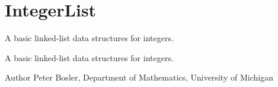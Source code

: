 \hypertarget{group__IntegerList}{\section{Integer\+List}
\label{group__IntegerList}
}


A basic linked-\/list data structures for integers.  


A basic linked-\/list data structures for integers. 

\begin{DoxyAuthor}{Author}
Peter Bosler, Department of Mathematics, University of Michigan 
\end{DoxyAuthor}
